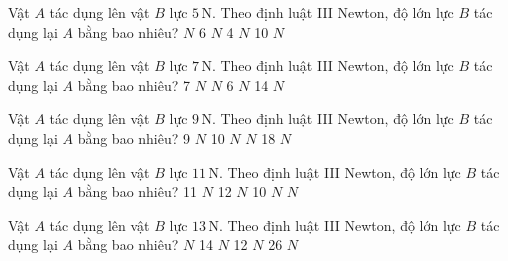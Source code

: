 

\begin{ex}
Vật $A$ tác dụng lên vật $B$ lực $5\,\text{N}$. Theo định luật III Newton, độ lớn lực $B$ tác dụng lại $A$ bằng bao nhiêu?
\choice
{ $N$}
{6 $N$}
{4 $N$}
{10 $N$}
\end{ex}

\begin{ex}
Vật $A$ tác dụng lên vật $B$ lực $7\,\text{N}$. Theo định luật III Newton, độ lớn lực $B$ tác dụng lại $A$ bằng bao nhiêu?
\choice
{7 $N$}
{ $N$}
{6 $N$}
{14 $N$}
\end{ex}

\begin{ex}
Vật $A$ tác dụng lên vật $B$ lực $9\,\text{N}$. Theo định luật III Newton, độ lớn lực $B$ tác dụng lại $A$ bằng bao nhiêu?
\choice
{9 $N$}
{10 $N$}
{ $N$}
{18 $N$}
\end{ex}

\begin{ex}
Vật $A$ tác dụng lên vật $B$ lực $11\,\text{N}$. Theo định luật III Newton, độ lớn lực $B$ tác dụng lại $A$ bằng bao nhiêu?
\choice
{11 $N$}
{12 $N$}
{10 $N$}
{ $N$}
\end{ex}

\begin{ex}
Vật $A$ tác dụng lên vật $B$ lực $13\,\text{N}$. Theo định luật III Newton, độ lớn lực $B$ tác dụng lại $A$ bằng bao nhiêu?
\choice
{ $N$}
{14 $N$}
{12 $N$}
{26 $N$}
\end{ex}

